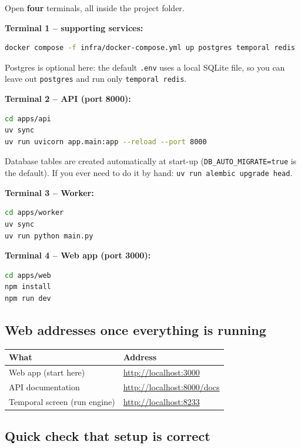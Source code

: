 \documentclass[11pt,a4paper]{article}
\newcommand{\env}[1]{\texttt{#1}}
\begin{document}
Open \textbf{four} terminals, all inside the project folder.

\textbf{Terminal 1 -- supporting services:}
\begin{lstlisting}[language=bash]
docker compose -f infra/docker-compose.yml up postgres temporal redis
\end{lstlisting}
Postgres is optional here: the default \texttt{.env} uses a local SQLite file, so you can
leave out \texttt{postgres} and run only \texttt{temporal redis}.

\textbf{Terminal 2 -- API (port 8000):}
\begin{lstlisting}[language=bash]
cd apps/api
uv sync
uv run uvicorn app.main:app --reload --port 8000
\end{lstlisting}
Database tables are created automatically at start-up (\env{DB\_AUTO\_MIGRATE=true} is the default).
If you ever need to do it by hand: \texttt{uv run alembic upgrade head}.

\textbf{Terminal 3 -- Worker:}
\begin{lstlisting}[language=bash]
cd apps/worker
uv sync
uv run python main.py
\end{lstlisting}

\textbf{Terminal 4 -- Web app (port 3000):}
\begin{lstlisting}[language=bash]
cd apps/web
npm install
npm run dev
\end{lstlisting}

\subsection{Web addresses once everything is running}\label{sec:urls}

\begin{longtable}{@{}L{4.2cm}L{6cm}@{}}
\toprule
\textbf{What} & \textbf{Address} \\
\midrule
Web app (start here) & \url{http://localhost:3000} \\
API documentation & \url{http://localhost:8000/docs} \\
Temporal screen (run engine) & \url{http://localhost:8233} \\
\bottomrule
\end{longtable}

\subsection{Quick check that setup is correct}\label{sec:verify}
\end{document}
